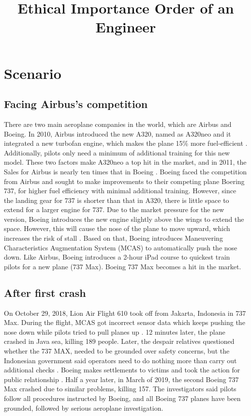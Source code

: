 \documentclass{article}
\title{Ethical Importance Order of an Engineer}
\begin{document}
\maketitle

\section{Scenario}
\subsection{Facing Airbus's competition}
\hspace{\parindent}
There are two main aeroplane companies in the world, which are Airbus and Boeing. In 2010, Airbus introduced the new A320, named as A320neo and it integrated a new turbofan engine, which makes the plane 15\% more fuel-efficient \cite{Therealr56:online}. Additionally, pilots only need a minimum of additional training for this new model. These two factors make A320neo a top hit in the market, and in 2011, the Sales for Airbus is nearly ten times that in Boeing \cite{AirbusA376:online}. Boeing faced the competition from Airbus and sought to make improvements to their competing plane Boering 737, for higher fuel efficiency with minimal additional training. However, since the landing gear for 737 is shorter than that in A320, there is little space to extend for a larger engine for 737. Due to the market pressure for the new version, Boeing introduces the new engine slightly above the wings to extend the space. However, this will cause the nose of the plane to move upward, which increases the risk of stall \cite{Therealr56:online}. Based on that, Boeing introduces Maneuvering Characteristics Augmentation System (MCAS) to automatically push the nose down. Like Airbus, Boeing introduces a 2-hour iPad course to quickest train pilots for a new plane (737 Max). Boeing 737 Max becomes a hit in the market.
\subsection{After first crash}
On October 29, 2018, Lion Air Flight 610 took off from Jakarta, Indonesia in 737 Max. During the flight, MCAS got incorrect sensor data which keeps pushing the nose down while pilots tried to pull planes up \cite{Therealr56:online}. 12 minutes later, the plane crashed in Java sea, killing 189 people. Later, the despair relatives questioned whether the 737 MAX, needed to be grounded over safety concerns, but the Indonesian government said operators need to do nothing more than carry out additional checks \cite{Families79:online}. Boeing makes settlements to victims and took the action for public relationship \cite{Ethiopia52:online}. Half a year later, in March of 2019, the second Boeing 737 Max crashed due to similar problems, killing 157. The investigators said pilots follow all procedures instructed by Boeing, and all Boeing 737 planes have been grounded, followed by serious aeroplane investigation.
\end{document}
